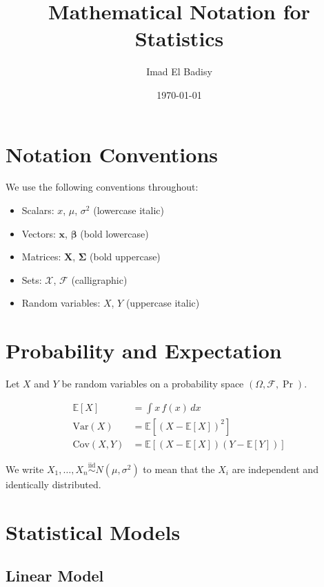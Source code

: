 \documentclass[12pt, a4paper]{article}
\title{Mathematical Notation for Statistics}
\author{Imad El Badisy}
\date{\today}
\newcommand{\E}{\mathbb{E}}
\newcommand{\Var}{\mathrm{Var}}
\newcommand{\Cov}{\mathrm{Cov}}
\newcommand{\iid}{\overset{\text{iid}}{\sim}}
\theoremstyle{definition}
\theoremstyle{remark}
\begin{document}
\maketitle
\tableofcontents
\newpage

\section{Notation Conventions}

We use the following conventions throughout:

\begin{itemize}
  \item Scalars: $x$, $\mu$, $\sigma^2$ (lowercase italic)
  \item Vectors: $\mathbf{x}$, $\boldsymbol{\beta}$ (bold lowercase)
  \item Matrices: $\mathbf{X}$, $\boldsymbol{\Sigma}$ (bold uppercase)
  \item Sets: $\mathcal{X}$, $\mathcal{F}$ (calligraphic)
  \item Random variables: $X$, $Y$ (uppercase italic)
\end{itemize}

\section{Probability and Expectation}

Let $X$ and $Y$ be random variables on a probability
space $(\Omega, \mathcal{F}, \Pr)$.

\begin{align}
  \E[X]        &= \int x \, f(x) \, dx                    \\
  \Var(X)      &= \E\left[(X - \E[X])^2\right]            \\
  \Cov(X, Y)   &= \E\left[(X - \E[X])(Y - \E[Y])\right]
\end{align}

We write $X_1, \ldots, X_n \iid N(\mu, \sigma^2)$ to mean
that the $X_i$ are independent and identically distributed.

\section{Statistical Models}

\subsection{Linear Model}
\end{document}

